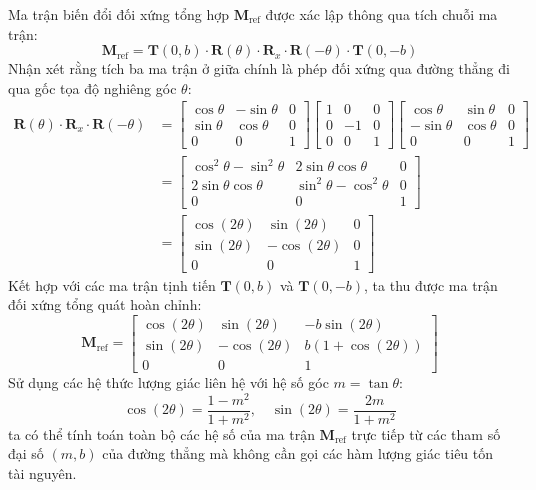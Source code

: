 Ma trận biến đổi đối xứng tổng hợp $\mathbf{M}_{\text{ref}}$ được xác lập thông qua tích chuỗi ma trận:
\begin{equation}
\label{eq:reflection_chain}
\mathbf{M}_{\text{ref}} = \mathbf{T}(0, b) \cdot \mathbf{R}(\theta) \cdot \mathbf{R}_x \cdot \mathbf{R}(-\theta) \cdot \mathbf{T}(0, -b)
\end{equation}
Nhận xét rằng tích ba ma trận ở giữa chính là phép đối xứng qua đường thẳng đi qua gốc tọa độ nghiêng góc $\theta$:
\begin{align}
\mathbf{R}(\theta) \cdot \mathbf{R}_x \cdot \mathbf{R}(-\theta) &= \begin{bmatrix} \cos\theta & -\sin\theta & 0 \\ \sin\theta & \cos\theta & 0 \\ 0 & 0 & 1 \end{bmatrix} \begin{bmatrix} 1 & 0 & 0 \\ 0 & -1 & 0 \\ 0 & 0 & 1 \end{bmatrix} \begin{bmatrix} \cos\theta & \sin\theta & 0 \\ -\sin\theta & \cos\theta & 0 \\ 0 & 0 & 1 \end{bmatrix} \nonumber \\
&= \begin{bmatrix} \cos^2\theta - \sin^2\theta & 2\sin\theta\cos\theta & 0 \\ 2\sin\theta\cos\theta & \sin^2\theta - \cos^2\theta & 0 \\ 0 & 0 & 1 \end{bmatrix} \nonumber \\
&= \begin{bmatrix} \cos(2\theta) & \sin(2\theta) & 0 \\ \sin(2\theta) & -\cos(2\theta) & 0 \\ 0 & 0 & 1 \end{bmatrix}
\end{align}
Kết hợp với các ma trận tịnh tiến $\mathbf{T}(0, b)$ và $\mathbf{T}(0, -b)$, ta thu được ma trận đối xứng tổng quát hoàn chỉnh:
\begin{equation}
\label{eq:reflection_final_matrix}
\mathbf{M}_{\text{ref}} = \begin{bmatrix} \cos(2\theta) & \sin(2\theta) & -b\sin(2\theta) \\ \sin(2\theta) & -\cos(2\theta) & b(1 + \cos(2\theta)) \\ 0 & 0 & 1 \end{bmatrix}
\end{equation}
Sử dụng các hệ thức lượng giác liên hệ với hệ số góc $m = \tan\theta$:
\begin{equation}
\cos(2\theta) = \frac{1 - m^2}{1 + m^2}, \quad \sin(2\theta) = \frac{2m}{1 + m^2}
\end{equation}
ta có thể tính toán toàn bộ các hệ số của ma trận $\mathbf{M}_{\text{ref}}$ trực tiếp từ các tham số đại số $(m, b)$ của đường thẳng mà không cần gọi các hàm lượng giác tiêu tốn tài nguyên.

